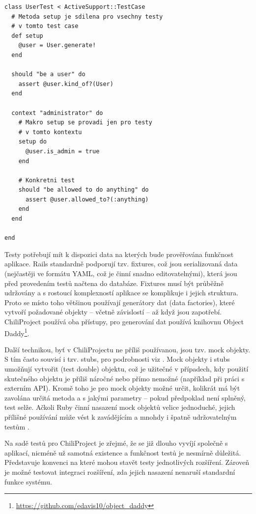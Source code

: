 \documentclass[thesis=B,czech]{FITthesis}[2012/05/02]
\begin{document}
\begin{lstlisting}
class UserTest < ActiveSupport::TestCase
  # Metoda setup je sdilena pro vsechny testy
  # v tomto test case
  def setup
    @user = User.generate!
  end

  should "be a user" do
    assert @user.kind_of?(User)
  end

  context "administrator" do
    # Makro setup se provadi jen pro testy
    # v tomto kontextu
    setup do
      @user.is_admin = true
    end

    # Konkretni test
    should "be allowed to do anything" do
      assert @user.allowed_to?(:anything)
    end
  end

end
\end{lstlisting}
Testy potřebují mít k dispozici data na kterých bude prověřována
funkčnost aplikace. Rails standardně podporují tzv. fixtures, což jsou
serializovaná data (nejčastěji ve formátu \gls{YAML}, což je činní
snadno editovatelnými), která jsou před provedením testů načtena do
databáze. Fixtures musí být průběžně udržovány a s rostoucí komplexností
aplikace se komplikuje i jejich struktura. Proto se místo toho většinou
používají generátory dat (data factories), které vytvoří požadované
objekty -- včetně závislostí -- až když jsou zapotřebí. ChiliProject
používá oba přístupy, pro generování dat používá knihovnu Object
Daddy\footnote{\url{https://github.com/edavis10/object_daddy}}.

Další technikou, byť v ChiliProjectu ne příliš používanou, jsou tzv.
mock objekty. S tím často souvisí i tzv. stubs, pro podrobnosti viz
\citep{FowlerMocks}. Mock objekty i stubs umožňují vytvořit
 (test double) objektu, což je užitečné v
případech, kdy použití skutečného objektu je příliš náročné nebo přímo
nemožné (například při práci s externím \gls{API}). Kromě toho je pro
mock objekty možné určit, kolikrát má být zavolána určitá metoda a s
jakými parametry -- pokud předpoklad není splněný, test selže. Ačkoli
Ruby činní nasazení mock objektů velice jednoduché, jejich přílišné
používání může vést k zavádějícím a mnohdy i špatně udržovatelným testům
\citep{Parsons2011}.

Na sadě testů pro ChiliProject je zřejmé, že se již dlouho vyvíjí
společně s aplikací, nicméně už samotná existence a funkčnost testů je
nesmírně důležitá. Představuje konvenci na které mohou stavět testy
jednotlivých rozšíření. Zároveň je možné testovat integraci rozšíření,
zda jejich nasazení nenaruší standardní funkce systému.
\end{document}
